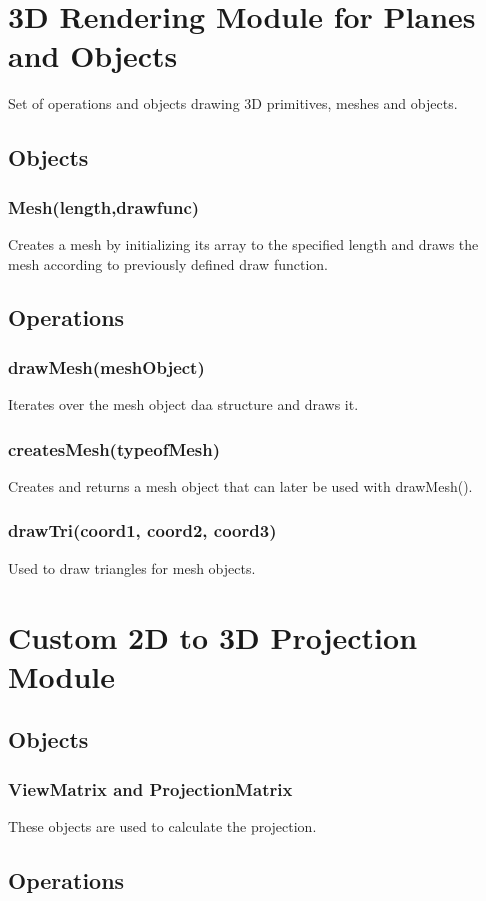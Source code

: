 \documentclass{report}
\begin{document}
\section{3D Rendering Module for Planes and Objects}
Set of operations and objects drawing 3D primitives, meshes and objects.
\subsection{Objects}
\subsubsection{Mesh(length,drawfunc)}
Creates a mesh by initializing its array to the specified length and draws the mesh according to previously defined draw function.
\subsection{Operations}
\subsubsection{drawMesh(meshObject)}
Iterates over the mesh object daa structure and draws it.
\subsubsection{createsMesh(typeofMesh)}
Creates and returns a mesh object that can later be used with drawMesh().
\subsubsection{drawTri(coord1, coord2, coord3)}
Used to draw triangles for mesh objects.

\section{Custom 2D to 3D Projection Module}
\subsection{Objects}
\subsubsection{ViewMatrix and ProjectionMatrix}
These objects are used to calculate the projection.
\subsection{Operations}
\end{document}
